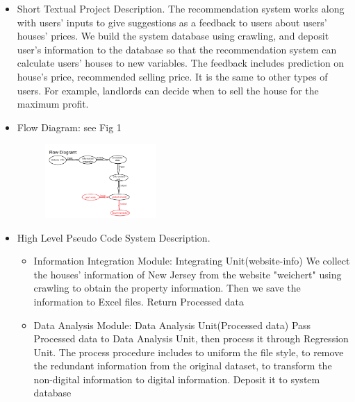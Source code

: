 



\begin{itemize} 
\item{  Short Textual Project Description. }
The recommendation system works along with users' inputs to give suggestions as a feedback to users about users' houses' prices. We build the system database using crawling, and deposit user's information to the database so that the recommendation system can calculate users' houses to new variables. The feedback includes prediction on house's price, recommended selling price. It is the same to other types of users. For example, landlords can decide when to sell the house for the maximum profit.
\item{ Flow Diagram: see Fig 1}
\begin{figure}
\centering
\includegraphics[width=0.4\textwidth]{512flowdiagram.png}
\caption{}
\end{figure}
\item{ High Level Pseudo Code System Description. }
\begin{itemize} 
\item{Information Integration Module: Integrating Unit(website-info)
We collect the houses' information of New Jersey from the website "weichert" using crawling to obtain the property information. Then we save the information to Excel files.
Return Processed data}

\item{Data Analysis Module: Data Analysis Unit(Processed data)
Pass Processed data to Data Analysis Unit, then process it through Regression Unit. The process procedure includes to uniform the file style, to remove the redundant information from the original dataset, to transform the non-digital information to digital information.
Deposit it to system database}


\end{itemize}
\end{itemize}
